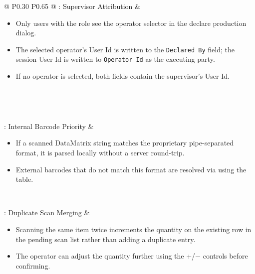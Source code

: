 \begin{longtable}{@{} P{0.30\linewidth} P{0.65\linewidth} @{}}
	: Supervisor Attribution & 
	\begin{itemize}
		\item Only users with the  role see the operator selector
		      in the declare production dialog.
		\item The selected operator's User Id is written to the \texttt{Declared By}
		      field; the session User Id is written to \texttt{Operator Id} as the
		      executing party.
		\item If no operator is selected, both fields contain the supervisor's User Id.
	\end{itemize} \\
	\midrule
	
	 \\
	\midrule
	
	: Internal Barcode Priority & 
	\begin{itemize}
		\item If a scanned DataMatrix string matches the proprietary pipe-separated
		      format, it is parsed locally without a server round-trip.
		\item External barcodes that do not match this format are resolved via
		       using the  table.
	\end{itemize} \\
	\midrule
	
	: Duplicate Scan Merging & 
	\begin{itemize}
		\item Scanning the same item twice increments the quantity on the existing row
		      in the pending scan list rather than adding a duplicate entry.
		\item The operator can adjust the quantity further using the +/$-$ controls
		      before confirming.
	\end{itemize} \\
	\midrule
	
	 \\
	\midrule
	

\end{longtable}
